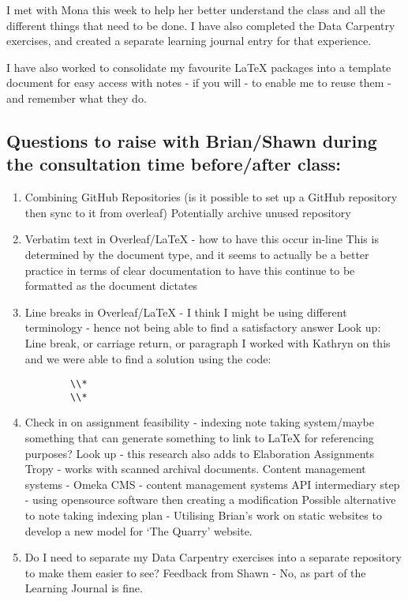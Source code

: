 \documentclass{article}
\begin{document}
I met with Mona this week to help her better understand the class and all the different things that need to be done. I have also completed the Data Carpentry exercises, and created a separate learning journal entry for that experience. 

I have also worked to consolidate my favourite LaTeX packages into a template document for easy access with notes -  if you will - to enable me to reuse them - and remember what they do. 

\subsection{Questions to raise with Brian/Shawn during the consultation time before/after class:}
\begin{enumerate}
    \item Combining GitHub Repositories (is it possible to set up a GitHub repository then sync to it from overleaf)
    \subitem Potentially archive unused repository
    \item Verbatim text in Overleaf/LaTeX - how to have this occur in-line
    \subitem This is determined by the document type, and it seems to actually be a better practice in terms of clear documentation to have this continue to be formatted as the document dictates
    \item Line breaks in Overleaf/LaTeX - I think I might be using different terminology - hence not being able to find a satisfactory answer
    \subitem Look up:
    \subitem Line break, or carriage return, or paragraph
    \subitem I worked with Kathryn on this and we were able to find a solution using the code:
    \begin{verbatim}
        \\*
        \\*
    \end{verbatim}
    \item Check in on assignment feasibility - indexing note taking system/maybe something that can generate something to link to LaTeX for referencing purposes?
    \subitem Look up - this research also adds to Elaboration Assignments
    \subitem Tropy - works with scanned archival documents. 
    \subitem Content management systems - Omeka
    \subitem CMS - content management systems
    \subitem API intermediary step - using opensource software then creating a modification
    \subitem Possible alternative to note taking indexing plan - Utilising Brian's work on static websites to develop a new model for `The Quarry' website.
    \item Do I need to separate my Data Carpentry exercises into a separate repository to make them easier to see?
    \subitem Feedback from Shawn - No, as part of the Learning Journal is fine. 
\end{enumerate}
\end{document}
